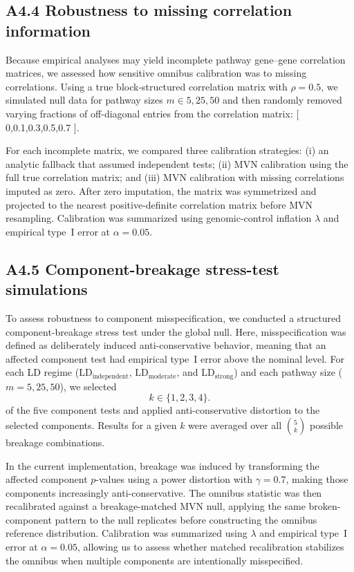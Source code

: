 \documentclass[unnumsec,webpdf,contemporary,large]{oup-authoring-template}%
\theoremstyle{thmstyleone}%
\theoremstyle{thmstyletwo}%
\theoremstyle{thmstylethree}%
\begin{document}
\begin{appendices}
\subsection{A4.4 Robustness to missing correlation information}

Because empirical analyses may yield incomplete pathway gene--gene correlation matrices, we assessed how sensitive omnibus calibration was to missing correlations. Using a true block-structured correlation matrix with $\rho=0.5$, we simulated null data for pathway sizes $m \in {5,25,50}$ and then randomly removed varying fractions of off-diagonal entries from the correlation matrix:
[
{0,0.1,0.3,0.5,0.7}
].

For each incomplete matrix, we compared three calibration strategies: (i) an analytic fallback that assumed independent tests; (ii) MVN calibration using the full true correlation matrix; and (iii) MVN calibration with missing correlations imputed as zero. After zero imputation, the matrix was symmetrized and projected to the nearest positive-definite correlation matrix before MVN resampling. Calibration was summarized using genomic-control inflation $\lambda$ and empirical type~I error at $\alpha=0.05$.

\subsection{A4.5 Component-breakage stress-test simulations}

To assess robustness to component misspecification, we conducted a structured component-breakage stress test under the global null. Here, misspecification was defined as deliberately induced anti-conservative behavior, meaning that an affected component test had empirical type~I error above the nominal level. For each LD regime ($\mathrm{LD}_{\mathrm{independent}}$, $\mathrm{LD}_{\mathrm{moderate}}$, and $\mathrm{LD}_{\mathrm{strong}}$) and each pathway size ($m=5,25,50$), we selected
\[
k \in \{1,2,3,4\}.
\]
of the five component tests and applied anti-conservative distortion to the selected components. Results for a given $k$ were averaged over all $\binom{5}{k}$ possible breakage combinations.

In the current implementation, breakage was induced by transforming the affected component $p$-values using a power distortion with $\gamma=0.7$, making those components increasingly anti-conservative. The omnibus statistic was then recalibrated against a breakage-matched MVN null, applying the same broken-component pattern to the null replicates before constructing the omnibus reference distribution. Calibration was summarized using $\lambda$ and empirical type~I error at $\alpha=0.05$, allowing us to assess whether matched recalibration stabilizes the omnibus when multiple components are intentionally misspecified.


\end{appendices}
\end{document}
